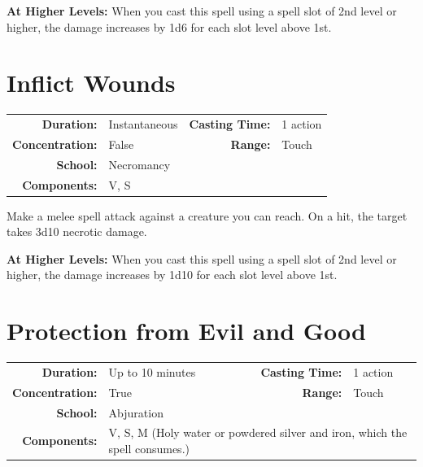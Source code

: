 \documentclass[12pt,showtrims]{memoir}
\begin{document}
\vspace{8pt} \noindent\textbf{At Higher Levels:} When you cast this spell using a spell slot of 2nd level or higher, the damage increases by 1d6 for each slot level above 1st.
\newpage
\section*{Inflict Wounds}

{
\small\centering\vspace{-6pt}
\begin{tabular}{rlrl}
\toprule

\textbf{Duration:} & Instantaneous &
\textbf{Casting Time:} & 1 action \\
\textbf{Concentration:} & False &
\textbf{Range:} & Touch \\
\textbf{School:} & Necromancy \\
\textbf{Components:} & \multicolumn{3}{p{0.7\textwidth}}{V, S}\\

\bottomrule
\end{tabular}
}

\vspace{1\baselineskip}\noindent Make a melee spell attack against a creature you can reach. On a hit, the target takes 3d10 necrotic damage.

\vspace{8pt} \noindent\textbf{At Higher Levels:} When you cast this spell using a spell slot of 2nd level or higher, the damage increases by 1d10 for each slot level above 1st.
\newpage
\section*{Protection from Evil and Good}

{
\small\centering\vspace{-6pt}
\begin{tabular}{rlrl}
\toprule

\textbf{Duration:} & Up to 10 minutes &
\textbf{Casting Time:} & 1 action \\
\textbf{Concentration:} & True &
\textbf{Range:} & Touch \\
\textbf{School:} & Abjuration \\
\textbf{Components:} & \multicolumn{3}{p{0.7\textwidth}}{V, S, M (Holy water or powdered silver and iron, which the spell consumes.)}\\

\bottomrule
\end{tabular}
}
\end{document}
